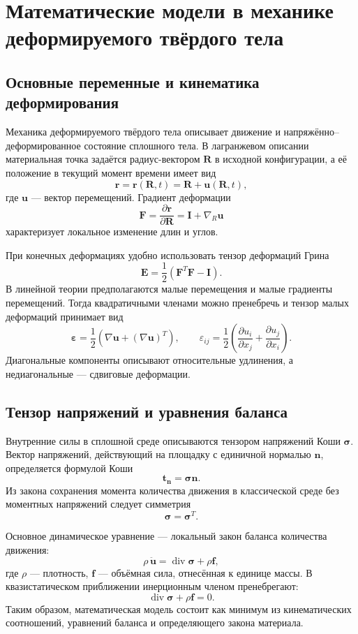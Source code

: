 \section{Математические модели в механике деформируемого твёрдого тела}
\label{sec:solid-mechanics-models}

\subsection{Основные переменные и кинематика деформирования}

Механика деформируемого твёрдого тела описывает движение и напряжённо--
деформированное состояние сплошного тела. В лагранжевом описании материальная
точка задаётся радиус-вектором $\mathbf R$ в исходной конфигурации, а её положение
в текущий момент времени имеет вид
\[
    \mathbf r=\mathbf r(\mathbf R,t)
    =\mathbf R+\mathbf u(\mathbf R,t),
\]
где $\mathbf u$ --- вектор перемещений. Градиент деформации
\[
    \mathbf F=\frac{\partial \mathbf r}{\partial \mathbf R}
    =\mathbf I+\nabla_{\!R}\mathbf u
\]
характеризует локальное изменение длин и углов.

При конечных деформациях удобно использовать тензор деформаций Грина
\[
    \mathbf E=\frac12\left(\mathbf F^{T}\mathbf F-\mathbf I\right).
\]
В линейной теории предполагаются малые перемещения и малые градиенты
перемещений. Тогда квадратичными членами можно пренебречь и тензор малых
деформаций принимает вид
\[
    \boldsymbol\varepsilon
    =\frac12\left(\nabla\mathbf u+(\nabla\mathbf u)^T\right),
    \qquad
    \varepsilon_{ij}=\frac12
    \left(\frac{\partial u_i}{\partial x_j}
          +\frac{\partial u_j}{\partial x_i}\right).
\]
Диагональные компоненты описывают относительные удлинения, а недиагональные
--- сдвиговые деформации.

\subsection{Тензор напряжений и уравнения баланса}

Внутренние силы в сплошной среде описываются тензором напряжений Коши
$\boldsymbol\sigma$. Вектор напряжений, действующий на площадку с единичной
нормалью $\mathbf n$, определяется формулой Коши
\[
    \mathbf t_{\mathbf n}=\boldsymbol\sigma\mathbf n.
\]
Из закона сохранения момента количества движения в классической среде без
моментных напряжений следует симметрия
\[
    \boldsymbol\sigma=\boldsymbol\sigma^T.
\]

Основное динамическое уравнение --- локальный закон баланса количества
движения:
\[
    \rho\,\ddot{\mathbf u}
    =\operatorname{div}\boldsymbol\sigma+\rho\mathbf f,
\]
где $\rho$ --- плотность, $\mathbf f$ --- объёмная сила, отнесённая к единице
массы. В квазистатическом приближении инерционным членом пренебрегают:
\[
    \operatorname{div}\boldsymbol\sigma+\rho\mathbf f=0.
\]
Таким образом, математическая модель состоит как минимум из кинематических
соотношений, уравнений баланса и определяющего закона материала.

